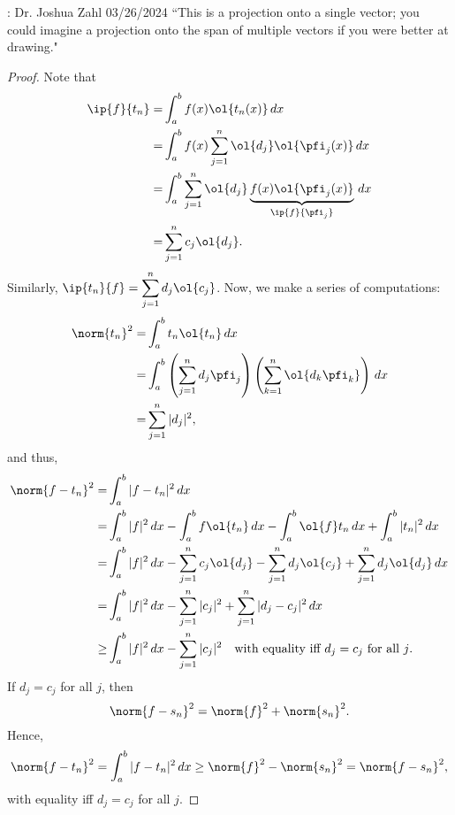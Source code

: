 \begin{nquote}{: Dr. Joshua Zahl 03/26/2024}
    ``This is a projection onto a single vector; you could imagine a projection onto the span of multiple vectors if you were better at drawing."
\end{nquote}
\begin{proof}
    Note that
    \begin{align*} 
        \ip{f}{t_n}=&\int_a^b f(x)\ol{t_n(x)} \, dx\\
                   =&\int_a^b f(x)\sum_{j=1}^n \ol{d_j}\ol{\pfi_j(x)} \, dx\\
                   =&\int_a^b \sum_{j=1}^n \ol{d_j}\underbrace{f(x)\ol{\pfi_j(x)}}_{\ip{f}{\pfi_j}} \, dx\\
                   =&\sum_{j=1}^n c_j\ol{d_j}.
    \end{align*}
    Similarly, \(\ip{t_n}{f}=\displaystyle\sum_{j=1}^n d_j\ol{c_j}\). Now, we make a series of computations:
    \begin{align*} 
        \norm{t_n}^2=&\int_a^b t_n\ol{t_n} \, dx\\
                    =&\int_a^b \left(\sum_{j=1}^n d_j\pfi_j\right)\left(\sum_{k=1}^n \ol{d_k\pfi_k}\right) \, dx\\
                    =&\sum_{j=1}^n |d_j|^2,
    \end{align*}
    and thus, 
    \begin{align*} 
        \norm{f-t_n}^2=&\int_a^b |f-t_n|^2 \, dx\\
                      =&\int_a^b |f|^2 \, dx -\int_a^b f\ol{t_n} \, dx-\int_a^b \ol{f}t_n \, dx+\int_a^b |t_n|^2 \, dx\\
                      =&\int_a^b |f|^2 \, dx -\sum_{j=1}^n c_j\ol{d_j}-\sum_{j=1}^n d_j\ol{c_j}+\sum_{j=1}^nd_j\ol{d_j} \, dx\\
                      =&\int_a^b |f|^2 \, dx -\sum_{j=1}^n |c_j|^2+\sum_{j=1}^n |d_j-c_j|^2 \, dx\\
                   \geq&\int_a^b |f|^2 \, dx -\sum_{j=1}^n |c_j|^2\quad\text{with equality iff \(d_j=c_j\) for all \(j\).}
    \end{align*}
    If \(d_j=c_j\) for all \(j\), then
    \begin{equation} 
        \norm{f-s_n}^2=\norm{f}^2+\norm{s_n}^2\label{d_j=c_j}.
    \end{equation}
    Hence,
    \begin{equation*} 
        \norm{f-t_n}^2=\int_a^b |f-t_n|^2 \, dx\geq \norm{f}^2-\norm{s_n}^2=\norm{f-s_n}^2,
    \end{equation*}
    with equality iff \(d_j=c_j\) for all \(j\).
\end{proof}
